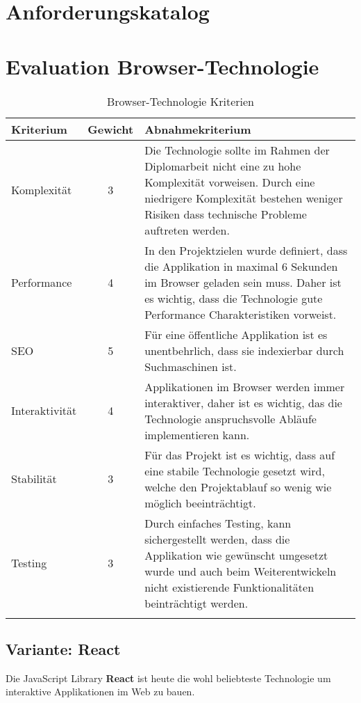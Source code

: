 \clearpage
\section{Anforderungskatalog}\label{anforderungskatalog}



\clearpage
\section{Evaluation Browser-Technologie}\label{evaluation-browser-technologie}

\begin{longtable}[]{@{}p{2cm}cp{10cm}@{}}
  \toprule
  \textbf{Kriterium} & \textbf{Gewicht} & \textbf{Abnahmekriterium}\tabularnewline
  \midrule
  \endhead
  Komplexität        & 3                & Die Technologie sollte im Rahmen der Diplomarbeit nicht eine zu hohe Komplexität vorweisen. Durch eine niedrigere Komplexität bestehen weniger Risiken dass technische Probleme auftreten werden.\tabularnewline
  \midrule
  Performance        & 4                & In den Projektzielen wurde definiert, dass die Applikation in maximal 6 Sekunden im Browser geladen sein muss. Daher ist es wichtig, dass die Technologie gute Performance Charakteristiken vorweist.\tabularnewline
  \midrule
  SEO                & 5                & Für eine öffentliche Applikation ist es unentbehrlich, dass sie indexierbar durch Suchmaschinen ist.\tabularnewline
  \midrule
  Interaktivität     & 4                & Applikationen im Browser werden immer interaktiver, daher ist es wichtig, das die Technologie anspruchsvolle Abläufe implementieren kann. \tabularnewline
  \midrule
  Stabilität         & 3                & Für das Projekt ist es wichtig, dass auf eine stabile Technologie gesetzt wird, welche den Projektablauf so wenig wie möglich beeinträchtigt. \tabularnewline
  \midrule
  Testing            & 3                & Durch einfaches Testing, kann sichergestellt werden, dass die Applikation wie gewünscht umgesetzt wurde und auch beim Weiterentwickeln nicht existierende Funktionalitäten beinträchtigt werden.\tabularnewline
  \bottomrule
  \caption{Browser-Technologie Kriterien}
\end{longtable}

\subsection{Variante: React}

Die JavaScript Library \textbf{React} ist heute die wohl beliebteste
Technologie um interaktive Applikationen im Web zu bauen.


